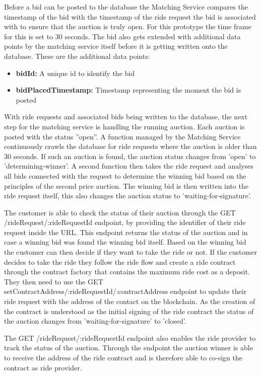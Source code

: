Before a bid can be posted to the database the Matching Service compares the timestamp of the bid with the timestamp of the ride request the bid is associated with to ensure that the auction is truly open. For this prototype the time frame for this is set to 30 seconds. The bid also gets extended with additional data points by the matching service itself before it is getting written onto the database. These are the additional data points:

\begin{itemize}
    \item \textbf{bidId:} A unique id to identify the bid
    \item \textbf{bidPlacedTimestamp:} Timestamp representing the moment the bid is posted
\end{itemize}

With ride requests and associated bids being written to the database, the next step for the matching service is handling the running auction. Each auction is posted with the status ''open''. A function managed by the Matching Service continuously crawls the database for ride requests where the auction is older than 30 seconds. If such an auction is found, the auction status changes from 'open' to 'determining-winner'. A second function then takes the ride request and analyses all bids connected with the request to determine the winning bid based on the principles of the second price auction. The winning bid is then written into the ride request itself, this also changes the auction status to 'waiting-for-signature'. 

The customer is able to check the status of their auction through the GET /rideRequest/:rideRequestId endpoint, by providing the identifier of their ride request inside the URL. This endpoint returns the status of the auction and in case a winning bid was found the winning bid itself. Based on the winning bid the customer can then decide if they want to take the ride or not. If the customer decides to take the ride they follow the ride flow and create a ride contract through the contract factory that contains the maximum ride cost as a deposit. They then need to use the GET setContractAddress/:rideRequestId/:contractAddress endpoint to update their ride request with the address of the contact on the blockchain. As the creation of the contract is understood as the initial signing of the ride contract the status of the auction changes from 'waiting-for-signature' to 'closed'. 

The GET /rideRequest/:rideRequestId endpoint also enables the ride provider to track the status of the auction. Through the endpoint the auction winner is able to receive the address of the ride contract and is therefore able to co-sign the contract as ride provider.

